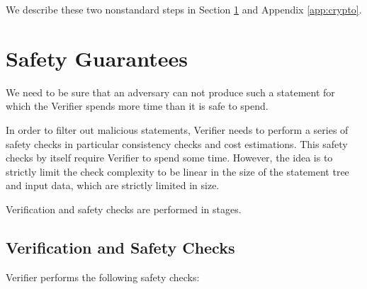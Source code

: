 \documentclass[11pt]{article}
\newcommand{\authnote}[2]{\marginpar{\parbox{\marginparwidth}{\tiny %
  \textsf{#1 {\textcolor{blue}{notes: #2}}}}}%
  \textcolor{blue}{\textbf{\dag}}}
\newcommand{\authnote}[2]{
  \textsf{#1 \textcolor{blue}{: #2}}}
\newcommand{\authnote}[2]{}
\newcommand{\lnote}[1]{{\authnote{\textcolor{orange}{Leo notes}}{#1}}}
\newcommand{\knote}[1]{{\authnote{\textcolor{green}{kushti notes}}{#1}}}
\begin{document}
We describe these two nonstandard steps in Section \ref{sec:safety} and Appendix \ref{app:crypto}. \lnote{Should they be both in the appendix or both in the main body?}


\section{Safety Guarantees}
\label{sec:safety}

We need to be sure that an adversary can not produce such a statement for
which the Verifier spends more time than it is safe to spend. \knote{links to
verifier dilemma, orphan rates etc}

In order to filter out malicious statements, Verifier needs to perform a
series of safety checks in particular consistency checks and cost
estimations. This safety checks by itself require Verifier to spend some
time. However, the idea is to strictly limit the check complexity to be
linear in the size of the statement tree and input data, which are strictly
limited in size.

Verification and safety checks are performed in stages.

\subsection{Verification and Safety Checks}
\label{sec:safety-checks}

Verifier performs the following safety checks:
\end{document}
